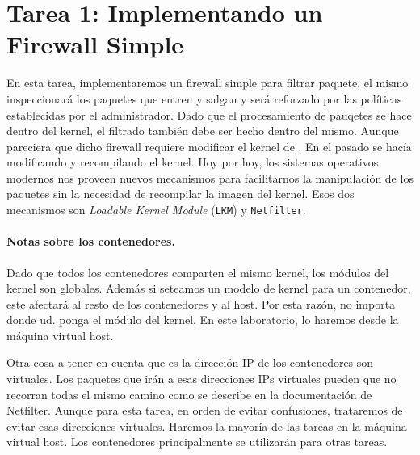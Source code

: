 %


\section{Tarea 1: Implementando un Firewall Simple} 

En esta tarea, implementaremos un firewall simple para filtrar paquete, el mismo inspeccionará los paquetes que entren y salgan y será reforzado por las políticas establecidas por el administrador. Dado que el procesamiento de pauqetes se hace dentro del kernel, el filtrado también debe ser hecho dentro del mismo. Aunque pareciera que dicho firewall requiere modificar el kernel de \linux. En el pasado se hacía modificando y recompilando el kernel. Hoy por hoy, los sistemas operativos \linux modernos nos proveen nuevos mecanismos para facilitarnos la manipulación de los paquetes sin la necesidad de recompilar la imagen del kernel. Esos dos mecanismos son \textit{Loadable Kernel Module} (\texttt{LKM}) y \texttt{Netfilter}.



\paragraph{Notas sobre los contenedores.}
Dado que todos los contenedores comparten el mismo kernel, los módulos del kernel son globales.
Además si seteamos un modelo de kernel para un contenedor, este afectará al resto de los contenedores y al host. Por esta razón, no importa donde ud. ponga el módulo del kernel. En este laboratorio, lo haremos desde la máquina virtual host.

Otra cosa a tener en cuenta que es la dirección IP de los contenedores son virtuales.
Los paquetes que irán a esas direcciones IPs virtuales pueden que no recorran todas el mismo camino como se describe en la documentación de Netfilter.
Aunque para esta tarea, en orden de evitar confusiones, trataremos de evitar esas direcciones virtuales.
Haremos la mayoría de las tareas en la máquina virtual host. Los contenedores principalmente se utilizarán para otras tareas.

